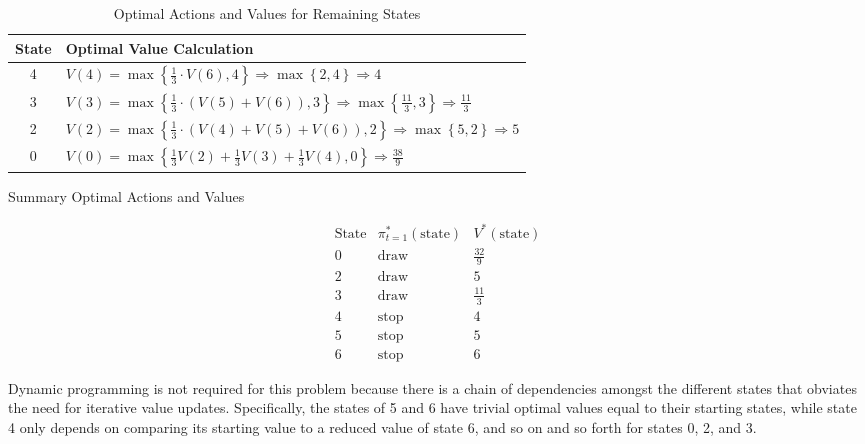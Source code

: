 \documentclass[11pt]{article}
\begin{document}
\begin{table}[h]
\centering
\renewcommand{\arraystretch}{1.5} %
\caption{Optimal Actions and Values for Remaining States}
\label{tab:optimal_values}
\vspace{1em}

\begin{tabular}{c|l}
\hline
\textbf{State} & \textbf{Optimal Value Calculation} \\
\hline
4 &
$V(4) = \max \left\{  \frac{1}{3} \cdot V(6), 4 \right\}
\Rightarrow \max \left\{ 2 , 4  \right\}
\Rightarrow 4$ \\
\hline

3 &
$V(3) = \max \left\{  \frac{1}{3} \cdot (V(5) + V(6)), 3 \right\}
\Rightarrow \max \left\{ \frac{11}{3} , 3  \right\}
\Rightarrow \frac{11}{3}$ \\
\hline

2 &
$V(2) = \max \left\{  \frac{1}{3} \cdot (V(4) + V(5) + V(6)), 2 \right\}
\Rightarrow \max \left\{ 5 , 2  \right\}
\Rightarrow 5$ \\
\hline

0 &
$V(0) = \max \left\{ \frac{1}{3} V(2) + \frac{1}{3} V(3) + \frac{1}{3} V(4) , 0  \right\} \Rightarrow \frac{38}{9}$ \\
\hline
\end{tabular}
\end{table}

\vspace{1em}

\begin{table}[h]
\centering
\renewcommand{\arraystretch}{1.3} %
\caption{Summary Optimal Actions and Values} %
\label{tab:summary_optimal_values} %
\[
\begin{array}{c|c|c}
  \text{State} & \pi^*_{t=1}(\text{state})
  & V^*(\text{state}) \\ \hline
  0 & \text{draw} & \frac{32}{9} \\
  2 & \text{draw} & 5 \\
  3 & \text{draw} & \frac{11}{3} \\
  4 & \text{stop} & 4 \\
  5 & \text{stop} & 5 \\
  6 & \text{stop} & 6
\end{array}
\]
\end{table}

Dynamic programming is not required for this problem because there is a chain of dependencies amongst the different states that obviates the need for
iterative value updates. Specifically, the states of 5 and 6 have trivial optimal values equal to their starting states, while state 4 only depends on
comparing its starting value to a reduced value of state 6, and so on and so forth for states 0, 2, and 3.
\end{document}
